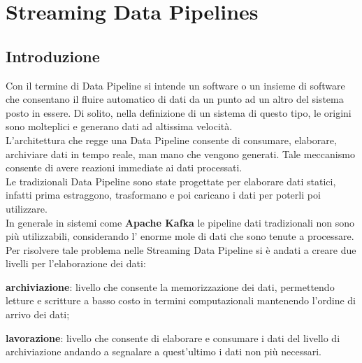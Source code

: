\section{Streaming Data Pipelines}
\subsection{Introduzione}
Con il termine di \gls{Data Pipeline}{} si intende un software o un insieme di software che consentano il fluire automatico
di dati da un punto ad un altro del sistema posto in essere. 
Di solito, nella definizione di un sistema di questo tipo, le origini sono molteplici e generano
dati ad altissima velocità.\\
L’architettura che regge una \gls{Data Pipeline}{} consente di consumare, elaborare, archiviare
dati in tempo reale, man mano che vengono generati. Tale meccanismo consente di avere reazioni immediate ai dati processati. \\
Le tradizionali \gls{Data Pipeline}{} sono state progettate per elaborare dati statici, infatti prima estraggono, trasformano e poi caricano i dati per 
poterli poi utilizzare.\\
In generale in sistemi come \textbf{Apache Kafka} le pipeline dati tradizionali non sono più utilizzabili, considerando 
l' enorme mole di dati che sono tenute a processare.\\
\noindent
Per risolvere tale problema nelle Streaming \gls{Data Pipeline}{} si è andati a creare due livelli per l'elaborazione dei dati: 
\begin{list}{*}
    \item \textbf{archiviazione}: livello che consente la memorizzazione dei dati, permettendo letture e scritture a basso costo in termini computazionali mantenendo l’ordine di arrivo
    dei dati;
    \item \item \textbf{lavorazione}: livello che consente di elaborare e consumare i dati del livello di archiviazione andando a segnalare
    a quest’ultimo i dati non più necessari.
\end{list}

